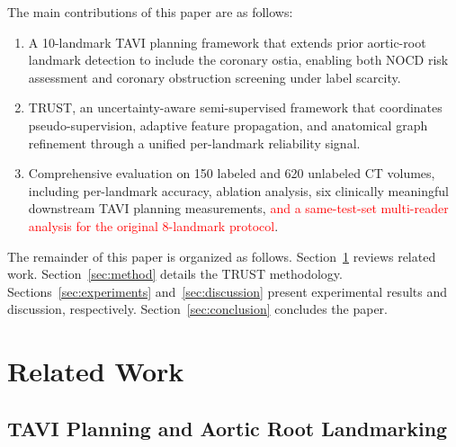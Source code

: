\documentclass[conference]{IEEEtran}
\begin{document}
The main contributions of this paper are as follows:
\begin{enumerate}
  \item A 10-landmark TAVI planning framework that extends prior aortic-root landmark detection to include the coronary ostia, enabling both NOCD risk assessment and coronary obstruction screening under label scarcity.
  \item TRUST, an uncertainty-aware semi-supervised framework that coordinates pseudo-supervision, adaptive feature propagation, and anatomical graph refinement through a unified per-landmark reliability signal.
  \item Comprehensive evaluation on 150 labeled and 620 unlabeled CT volumes, including per-landmark accuracy, ablation analysis, six clinically meaningful downstream TAVI planning measurements, \textcolor{red}{and a same-test-set multi-reader analysis for the original 8-landmark protocol}.
\end{enumerate}

The remainder of this paper is organized as follows. Section~\ref{sec:related} reviews related work. Section~\ref{sec:method} details the TRUST methodology. Sections~\ref{sec:experiments} and~\ref{sec:discussion} present experimental results and discussion, respectively. Section~\ref{sec:conclusion} concludes the paper.

\section{Related Work}
\label{sec:related}

\subsection{TAVI Planning and Aortic Root Landmarking}
\end{document}

